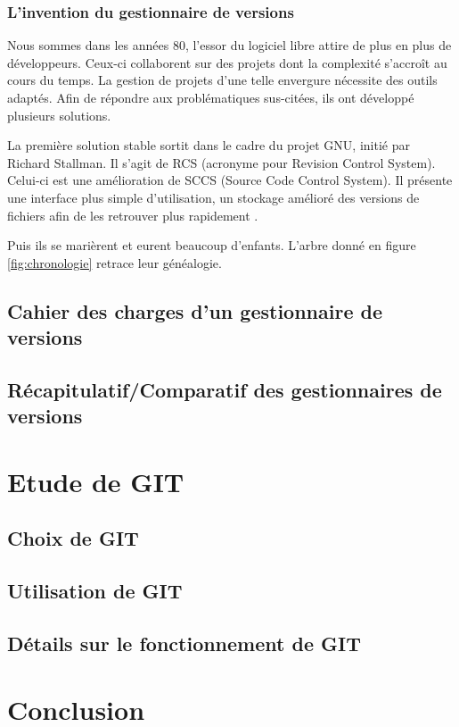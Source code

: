 \subsubsection{L'invention du gestionnaire de versions}

Nous sommes dans les années 80, l'essor du logiciel libre attire de plus en plus de développeurs. 
Ceux-ci collaborent sur des projets dont la complexité s'accroît au cours du temps. 
La gestion de projets d'une telle envergure nécessite des outils adaptés. 
Afin de répondre aux problématiques sus-citées, ils ont développé plusieurs solutions. 

La première solution stable sortit dans le cadre du projet GNU, initié par Richard Stallman. Il s'agit de RCS (acronyme pour Revision Control System). 
Celui-ci est une amélioration de SCCS (Source Code Control System). Il présente une interface plus simple d'utilisation, un stockage amélioré des versions de fichiers afin de les retrouver plus rapidement . 

Puis ils se marièrent et eurent beaucoup d'enfants. L'arbre donné en figure \ref{fig:chronologie} retrace leur généalogie. 

\subsection{Cahier des charges d'un gestionnaire de versions}



\subsection{Récapitulatif/Comparatif des gestionnaires de versions}



\section{Etude de GIT}

\subsection{Choix de GIT}

\subsection{Utilisation de GIT}

\subsection{Détails sur le fonctionnement de GIT}

\section*{Conclusion}


